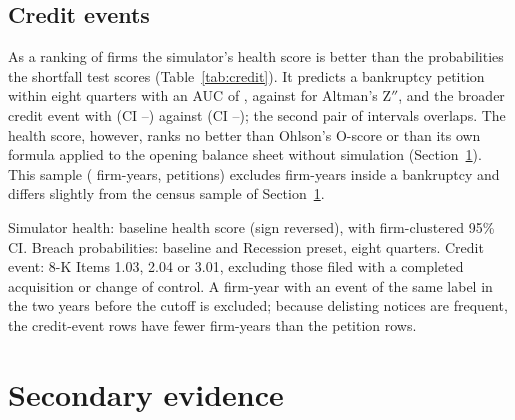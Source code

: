 \documentclass[preprint,12pt,authoryear]{elsarticle}
\begin{document}
\subsection{Credit events}
As a ranking of firms the simulator's health score is better than the probabilities the shortfall test scores (Table~\ref{tab:credit}). It predicts a bankruptcy petition within eight quarters with an AUC of \BkAucTwin, against \BkAucZ{} for Altman's Z$''$, and the broader credit event with \CeAucTwin{} (CI \CeAucTwinLo--\CeAucTwinHi) against \CeAucZ{} (CI \CeAucZLo--\CeAucZHi); the second pair of intervals overlaps. The health score, however, ranks no better than Ohlson's O-score or than its own formula applied to the opening balance sheet without simulation (Section~\ref{sec:secondary}). This sample (\BkNThree{} firm-years, \BkEvThree{} petitions) excludes firm-years inside a bankruptcy and differs slightly from the census sample of Section~\ref{sec:secondary}.

\begin{table}[t]
\centering\scriptsize
\setlength{\tabcolsep}{4pt}
\caption{Credit-event check: AUC of credit events within the horizon}
\label{tab:credit}
\resizebox{\linewidth}{!}{}
\par\smallskip
\begin{minipage}{\linewidth}\footnotesize
Simulator health: baseline health score (sign reversed), with firm-clustered 95\% CI. Breach probabilities: baseline and Recession preset, eight quarters. Credit event: 8-K Items 1.03, 2.04 or 3.01, excluding those filed with a completed acquisition or change of control. A firm-year with an event of the same label in the two years before the cutoff is excluded; because delisting notices are frequent, the credit-event rows have fewer firm-years than the petition rows.
\end{minipage}
\end{table}

\section{Secondary evidence}\label{sec:secondary}
\end{document}
